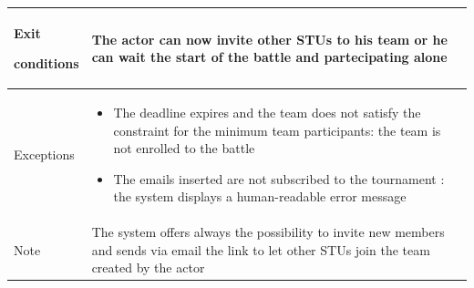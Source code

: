 \begin{center}
\begin{tabular}{| m{2cm} | m{10cm}|}
        Exit \par conditions  & The actor can now invite other STUs to his team or he can wait the start of the battle and partecipating alone                                   \\ \hline
        Exceptions            & \begin{itemize}
                                    \item The deadline expires and the team does not satisfy the constraint for the minimum team participants: the team is not enrolled to the battle
                                    \item The emails inserted are not subscribed to the tournament : the system displays a human-readable error message
                                \end{itemize} \\ \hline
        Note                  & The system offers always the possibility to invite new members and sends via email the link to let other STUs join the team created by the actor \\ \hline
    \end{tabular}
\end{center}


